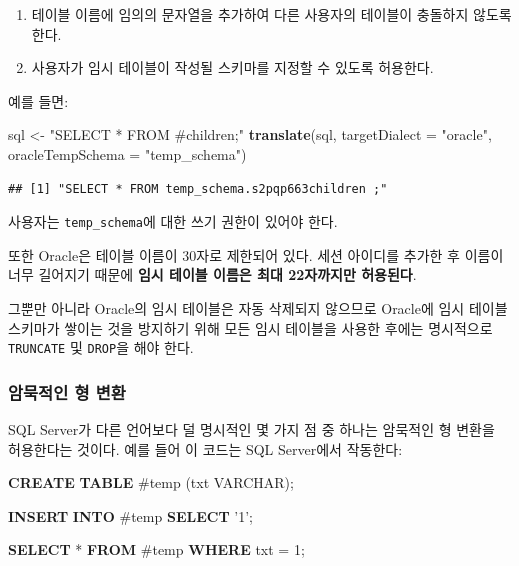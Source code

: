 \documentclass[10.5pt]{book}
\newenvironment{Shaded}{\begin{snugshade}}{\end{snugshade}}
\newcommand{\KeywordTok}[1]{\textcolor[rgb]{0.13,0.29,0.53}{\textbf{#1}}}
\newcommand{\DataTypeTok}[1]{\textcolor[rgb]{0.13,0.29,0.53}{#1}}
\newcommand{\DecValTok}[1]{\textcolor[rgb]{0.00,0.00,0.81}{#1}}
\newcommand{\StringTok}[1]{\textcolor[rgb]{0.31,0.60,0.02}{#1}}
\newcommand{\NormalTok}[1]{#1}
\providecommand{\tightlist}{%
  \setlength{\itemsep}{0pt}\setlength{\parskip}{0pt}}
\theoremstyle{definition}
\theoremstyle{definition}
\theoremstyle{definition}
\theoremstyle{remark}
\begin{document}
\begin{enumerate}
\def\labelenumi{\arabic{enumi}.}
\tightlist
\item
  테이블 이름에 임의의 문자열을 추가하여 다른 사용자의 테이블이 충돌하지
  않도록 한다.
\item
  사용자가 임시 테이블이 작성될 스키마를 지정할 수 있도록 허용한다.
\end{enumerate}

예를 들면:

\begin{Shaded}
\begin{Highlighting}[]
\NormalTok{sql <-}\StringTok{ "SELECT * FROM #children;"}
\KeywordTok{translate}\NormalTok{(sql, }\DataTypeTok{targetDialect =} \StringTok{"oracle"}\NormalTok{, }\DataTypeTok{oracleTempSchema =} \StringTok{"temp_schema"}\NormalTok{)}
\end{Highlighting}
\end{Shaded}

\begin{verbatim}
## [1] "SELECT * FROM temp_schema.s2pqp663children ;"
\end{verbatim}

사용자는 \texttt{temp\_schema}에 대한 쓰기 권한이 있어야 한다.

또한 Oracle은 테이블 이름이 30자로 제한되어 있다. 세션 아이디를 추가한
후 이름이 너무 길어지기 때문에 \textbf{임시 테이블 이름은 최대
22자까지만 허용된다}.

그뿐만 아니라 Oracle의 임시 테이블은 자동 삭제되지 않으므로 Oracle에
임시 테이블 스키마가 쌓이는 것을 방지하기 위해 모든 임시 테이블을 사용한
후에는 명시적으로 \texttt{TRUNCATE} 및 \texttt{DROP}을 해야 한다.

\subsubsection*{암묵적인 형 변환}\label{--}

SQL Server가 다른 언어보다 덜 명시적인 몇 가지 점 중 하나는 암묵적인 형
변환을 허용한다는 것이다. 예를 들어 이 코드는 SQL Server에서 작동한다:

\begin{Shaded}
\begin{Highlighting}[]
\KeywordTok{CREATE} \KeywordTok{TABLE}\NormalTok{ #temp (txt }\DataTypeTok{VARCHAR}\NormalTok{);}

\KeywordTok{INSERT} \KeywordTok{INTO}\NormalTok{ #temp}
\KeywordTok{SELECT} \StringTok{'1'}\NormalTok{;}

\KeywordTok{SELECT}\NormalTok{ * }\KeywordTok{FROM}\NormalTok{ #temp }\KeywordTok{WHERE}\NormalTok{ txt = }\DecValTok{1}\NormalTok{;}
\end{Highlighting}
\end{Shaded}
\end{document}
